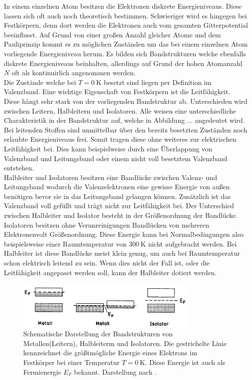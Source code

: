 In einem einzelnen Atom besitzen die Elektronen diskrete Energieniveaus. Diese lassen sich oft auch noch theoretisch bestimmen. Schwieriger wird es hingegen bei Festkörpern,
denn dort werden die Elektronen auch vom gesamten Gitterpotential beeinflusst. Auf Grund von einer großen Anzahl gleicher Atome und dem Pauliprinzip kommt es zu möglichen
Zuständen um das bei einem einzelnen Atom vorliegende Energieniveau herum. Es bilden sich Bandstrukturen welche ebenfalls diskrete Energieniveaus beinhalten, allerdings auf Grund
der hohen Atomanzahl $N$ oft als kontinuirlich angenommen werden. 
\\
Die Zustände welche bei $T = \SI{0}{\kelvin}$ besetzt sind liegen per Definition im Valenzband. Eine wichtige Eigenschaft von Festkörpern ist die Leitfähigkeit. Diese
hängt sehr stark von der vorliegenden Bandstruktur ab. Unterschieden wird zwischen Leitern, Halbleitern und Isolatoren. Alle weisen eine unterschiedliche Charakteristik in der
Bandstruktur auf, welche in Abbildung ... angedeutet wird.
\\
Bei leitenden Stoffen sind unmittelbar über den bereits besetzten Zuständen noch erlaubte Energieniveaus frei. Somit tragen diese ohne weiteres zur elektrischen Leitfähigkeit bei.
Dies kann beispielweise durch eine Überlappung von Valenzband und Leitungsband oder einem nicht voll besetztem Valenzband entstehen.
\\
Halbleiter und Isolatoren besitzen eine Bandlücke zwischen Valenz- und Leitungsband wodurch die Valenzelektronen eine gewisse Energie von außen benötigen bevor sie in das Leitungsband gelangen können.
Zusätzlich ist das Valenzband voll gefüllt und trägt nicht zur Leitfähigkeit bei. Der Unterschied zwischen Halbleiter und Isolator besteht in der Größenordnung der Bandlücke. 
Isolatoren besitzen ohne Verunreinigungen Bandlücken von mehreren Elektronenvolt Größenordnung. Diese Energie kann bei Normalbedingungen also beispielsweise einer Raumtemperatur von $\SI{300}{\kelvin}$ 
nicht aufgebracht werden. Bei Halbleiter ist diese Bandlücke meist klein genug, um auch bei Raumtemperatur schon elektrisch leitend zu sein. 
Wenn dies nicht der Fall ist, oder die Leitfähigkeit angepasst werden soll, kann der Halbleiter dotiert werden.
\begin{figure}
    \centering
    \includegraphics[width=0.8\textwidth]{bilder/bandstruktur.png}    
    \caption{Schematische Darstellung der Bandstrukturen von Metallen(Leitern), Halbleiterm und Isolatoren. Die gestrichelte Linie kennzeichnet die größtmögliche Energie eines Elektrons im Festkörper bei einer Temperatur $T = \SI{0}{\kelvin}$. 
    Diese Energie ist auch als Fermienergie $E_F$ bekannt. Darstellung nach \cite{Kopitzki2017}.}
    \label{fig:bandstruktur}
\end{figure}

